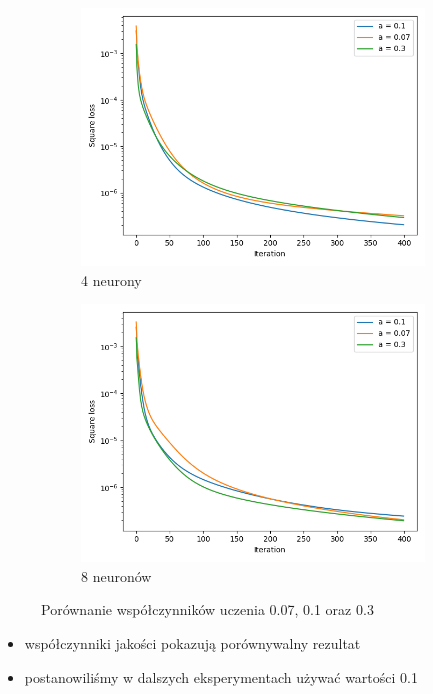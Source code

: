 \documentclass[12pt,a4paper]{article}
\begin{document}
\begin{figure}[h]
  \centering
\begin{subfigure}{0.5\textwidth}
  \includegraphics[width=\linewidth]{charts/learning_rates/4neurons2.png}
  \caption{4 neurony}
  \label{}
\end{subfigure}\hfil
\begin{subfigure}{0.5\textwidth}
  \includegraphics[width=\linewidth]{charts/learning_rates/8neurons.png}
  \caption{8 neuronów}
  \label{}
\end{subfigure}
\caption{Porównanie współczynników uczenia 0.07, 0.1 oraz 0.3}
\label{}
\end{figure}

\begin{itemize}
  \item   współczynniki jakości pokazują porównywalny rezultat
  \item   postanowiliśmy w dalszych eksperymentach używać wartości 0.1
\end{itemize}
\end{document}
